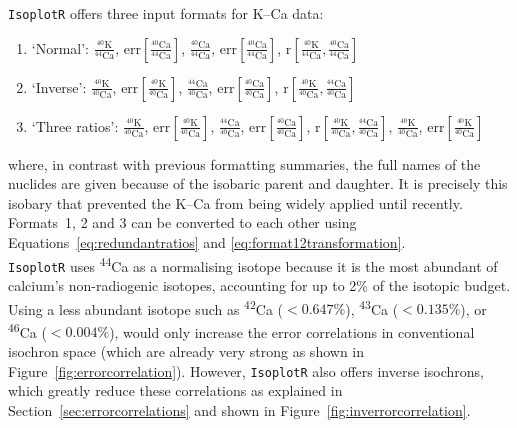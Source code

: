 \begin{refsection}
\texttt{IsoplotR} offers three input formats for K--Ca data:
\begin{enumerate}
\item{`Normal':}
  $\frac{{}^{40}\mbox{K}}{{}^{44}\mbox{Ca}}$,  
  $\mbox{err}\!\left[\frac{{}^{40}\mbox{Ca}}{{}^{44}\mbox{Ca}}\right]$, 
  $\frac{{}^{40}\mbox{Ca}}{{}^{44}\mbox{Ca}}$,
  $\mbox{err}\!\left[\frac{{}^{40}\mbox{Ca}}{{}^{44}\mbox{Ca}}\right]$,  
  $\mbox{r}\!\left[\frac{{}^{40}\mbox{K}}{{}^{44}\mbox{Ca}},
    \frac{{}^{40}\mbox{Ca}}{{}^{44}\mbox{Ca}}\right]$
\item{`Inverse':}
  $\frac{{}^{40}\mbox{K}}{{}^{40}\mbox{Ca}}$,  
  $\mbox{err}\!\left[\frac{{}^{40}\mbox{K}}{{}^{40}\mbox{Ca}}\right]$, 
  $\frac{{}^{44}\mbox{Ca}}{{}^{40}\mbox{Ca}}$,  
  $\mbox{err}\!\left[\frac{{}^{40}\mbox{Ca}}{{}^{40}\mbox{Ca}}\right]$,  
  $\mbox{r}\!\left[\frac{{}^{40}\mbox{K}}{{}^{40}\mbox{Ca}},
    \frac{{}^{44}\mbox{Ca}}{{}^{40}\mbox{Ca}}\right]$
\item{`Three ratios':}
  $\frac{{}^{40}\mbox{K}}{{}^{40}\mbox{Ca}}$,  
  $\mbox{err}\!\left[\frac{{}^{40}\mbox{K}}{{}^{40}\mbox{Ca}}\right]$, 
  $\frac{{}^{44}\mbox{Ca}}{{}^{40}\mbox{Ca}}$,  
  $\mbox{err}\!\left[\frac{{}^{40}\mbox{Ca}}{{}^{40}\mbox{Ca}}\right]$,  
  $\mbox{r}\!\left[\frac{{}^{40}\mbox{K}}{{}^{40}\mbox{Ca}},
    \frac{{}^{44}\mbox{Ca}}{{}^{40}\mbox{Ca}}\right]$,
  $\frac{{}^{40}\mbox{K}}{{}^{40}\mbox{Ca}}$,  
  $\mbox{err}\!\left[\frac{{}^{40}\mbox{K}}{{}^{40}\mbox{Ca}}\right]$
\end{enumerate}

\noindent where, in contrast with previous formatting summaries, the
full names of the nuclides are given because of the isobaric parent
and daughter. It is precisely this isobary that prevented the K--Ca
from being widely applied until recently. Formats~1, 2 and 3 can be
converted to each other using Equations~\ref{eq:redundantratios} and
\ref{eq:format12transformation}.\\

\texttt{IsoplotR} uses \textsuperscript{44}Ca as a normalising isotope
because it is the most abundant of calcium's non-radiogenic isotopes,
accounting for up to 2\% of the isotopic budget. Using a less abundant
isotope such as \textsuperscript{42}Ca ($<0.647\%$),
\textsuperscript{43}Ca ($<0.135\%$), or \textsuperscript{46}Ca
($<0.004\%$), would only increase the error correlations in
conventional isochron space (which are already very strong as shown in
Figure~\ref{fig:errorcorrelation}). However, \texttt{IsoplotR} also
offers inverse isochrons, which greatly reduce these correlations as
explained in Section~\ref{sec:errorcorrelations} and shown in
Figure~\ref{fig:inverrorcorrelation}.

\printbibliography[heading=subbibliography]

\end{refsection}
